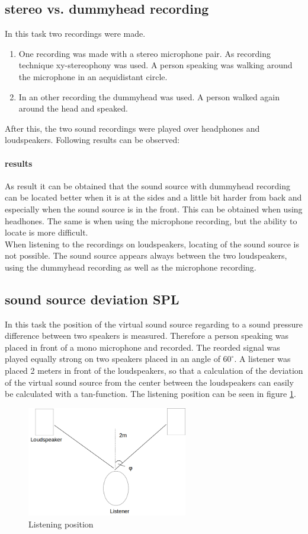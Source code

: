 \documentclass{article}
\begin{document}
\subsection{stereo vs. dummyhead recording}
In this task two recordings were made. 
\begin{enumerate}
\item One recording was made with a stereo microphone pair. As recording technique xy-stereophony was used. A person speaking was walking around the microphone in an aequidistant circle.
\item In an other recording the dummyhead was used. A person walked again around the head and speaked.
\end{enumerate}
After this, the two sound recordings were played over headphones and loudspeakers. Following results can be observed:
\paragraph{results\\}
As result it can be obtained that the sound source with dummyhead recording can be located better when it is at the sides and a little bit harder from back and especially when the sound source is in the front. This can be obtained when using headhones. The same is when using the microphone recording, but the ability to locate is more difficult.\\
When listening to the recordings on loudspeakers, locating of the sound source is not possible. The sound source appears always between the two loudspeakers, using the dummyhead recording as well as the microphone recording.
\subsection{sound source deviation SPL}
In this task the position of the virtual sound source regarding to a sound pressure difference between two speakers is measured. Therefore a person speaking was placed in front of a mono microphone and recorded. The reorded signal was played equally strong on two speakers placed in an angle of $60^\circ$. A listener was placed 2 meters in front of the loudspeakers, so that a calculation of the deviation of the virtual sound source from the center between the loudspeakers can easily be calculated with a tan-function. The listening position can be seen in figure \ref{fig:listening}.
\begin{figure}[htbp]
\begin{center}
\includegraphics[width=7cm,keepaspectratio=true]{listening}
\caption{Listening position}
\label{fig:listening}
\end{center}
\end{figure}
\end{document}
